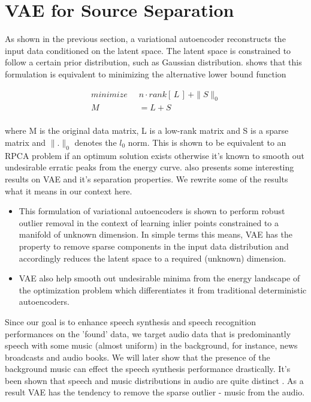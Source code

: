 \section{VAE for Source Separation}
As shown in the previous section, a variational autoencoder reconstructs the input data conditioned on the latent space. The latent space is constrained to follow a certain prior distribution, such as Gaussian distribution. \cite{JMLR:v19:17-704} shows that this formulation is equivalent to minimizing the alternative lower bound function 

\begin{equation}
\begin{aligned}
minimize \;\; & n \cdot rank[\, L \,] \,+ \parallel S \parallel_0   \\
M & = L + S \\
\end{aligned}
\end{equation}


where M is the original data matrix, L is a low-rank matrix and S is a sparse matrix and $\parallel.\parallel_0$ denotes the $l_0$ norm. This is shown to be equivalent to an RPCA problem if an optimum solution exists otherwise it's known to smooth out undesirable erratic peaks from the energy curve. \cite{JMLR:v19:17-704} also presents some interesting results on VAE and it's separation properties. We rewrite some of the results what it means in our context here.


\begin{itemize}
    \item This formulation of variational autoencoders is shown to perform robust outlier removal in the context of learning inlier points constrained to a manifold of unknown dimension. In simple terms this means, VAE has the property to remove sparse components in the input data distribution and accordingly reduces the latent space to a required (unknown) dimension.
    \item VAE also help smooth out undesirable minima from the energy landscape of the optimization problem which differentiates it from traditional deterministic autoencoders.
\end{itemize}
 
Since our goal is to enhance speech synthesis and speech recognition performances on the 'found' data, we target audio data that is predominantly speech with some music (almost uniform) in the background, for instance, news broadcasts and audio books. We will later show that the presence of the background music can effect the speech synthesis performance drastically. It's been shown that speech and music distributions in audio are quite distinct \cite{SM_diff} \cite{SM_diff1}. As a result VAE has the tendency to remove the sparse outlier - music from the audio. \\ 


